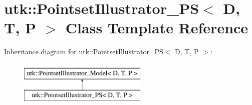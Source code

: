 \hypertarget{classutk_1_1PointsetIllustrator__PS}{\section{utk\-:\-:Pointset\-Illustrator\-\_\-\-P\-S$<$ D, T, P $>$ Class Template Reference}
\label{classutk_1_1PointsetIllustrator__PS}
}
Inheritance diagram for utk\-:\-:Pointset\-Illustrator\-\_\-\-P\-S$<$ D, T, P $>$\-:\begin{figure}[H]
\begin{center}
\leavevmode
\includegraphics[height=2.000000cm]{classutk_1_1PointsetIllustrator__PS}
\end{center}
\end{figure}
